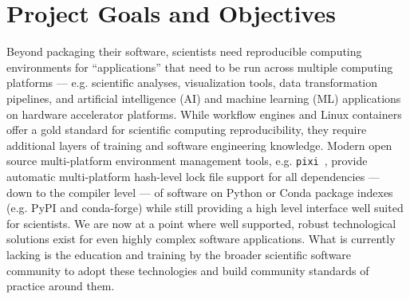 \documentclass[letterpaper, 11pt]{article}
\begin{document}
\pagestyle{fancy}

\section{Project Goals and Objectives}



Beyond packaging their software, scientists need reproducible computing environments for ``applications'' that need to be run across multiple computing platforms --- e.g. scientific analyses, visualization tools, data transformation pipelines, and artificial intelligence (AI) and machine learning (ML) applications on hardware accelerator platforms.
While workflow engines and Linux containers offer a gold standard for scientific computing reproducibility, they require additional layers of training and software engineering knowledge.
Modern open source multi-platform environment management tools, e.g. \texttt{pixi}~, provide automatic multi-platform hash-level lock file support for all dependencies --- down to the compiler level --- of software on Python or Conda package indexes (e.g. PyPI and conda-forge) while still providing a high level interface well suited for scientists.
We are now at a point where well supported, robust technological solutions exist for even highly complex software applications.
What is currently lacking is the education and training by the broader scientific software community to adopt these technologies and build community standards of practice around them.
\end{document}
